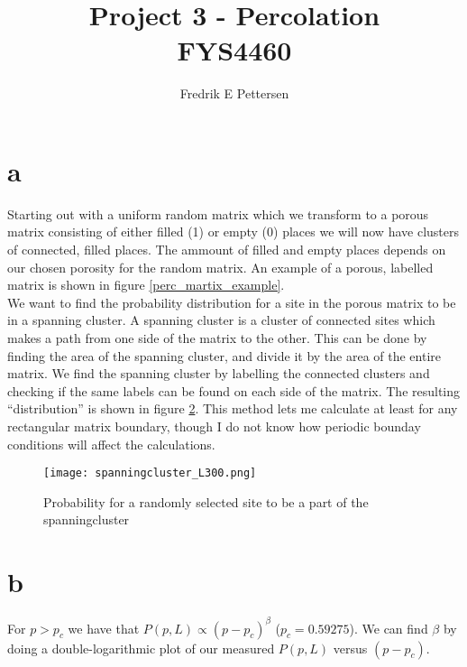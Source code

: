 \documentclass[a4paper,english, 10pt, twoside]{article}
\title{Project 3 - Percolation \\ FYS4460}
\author{Fredrik E Pettersen}
\begin{document}
 
 \maketitle
 \section*{a}
 Starting out with a uniform random matrix which we transform to a porous matrix consisting of
 either filled (1) or empty (0) places we will now have clusters of connected, filled places. 
 The ammount of filled and empty places depends on our chosen porosity for the random matrix. 
 An example of a porous, labelled matrix is shown in figure \ref{perc_martix_example}.\\
We want to find the probability distribution for a site in the porous matrix to be in a spanning cluster. A 
spanning cluster is a cluster of connected sites which makes a path from one side of the matrix
to the other. This can be done by finding the area of the spanning cluster, and divide it by
the area of the entire matrix. We find the spanning cluster by labelling the connected clusters 
and checking if the same labels can be found on each side of the matrix. The resulting ``distribution'' 
is shown in figure \ref{P(p,L)}.
This method lets me calculate at least for any rectangular matrix boundary, though I do not know how periodic
bounday conditions will affect the calculations.

\begin{figure}[H]
\centering
\label{perc_matrix_example}
\end{figure}

\begin{figure}[H]
\centering
 \texttt{[image: spanningcluster\_L300.png]}
 \caption{Probability for a randomly selected site to be a part of the spanningcluster}
 \label{P(p,L)}
\end{figure}

\section*{b}
For $p>p_c$ we have that $P(p,L) \propto (p-p_c)^\beta$ ($p_c = 0.59275$). We can find $\beta$ by doing 
a double-logarithmic plot of our measured $P(p,L)$ versus $(p-p_c)$.
\end{document}
